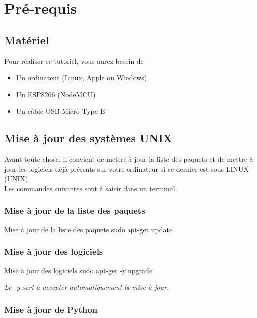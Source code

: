 \chapter{Pré-requis}

\section{Matériel}

Pour réaliser ce tutoriel, vous aurez besoin de 

\begin{itemize}
    \item Un ordinateur (Linux, Apple ou Windows)
    \item Un ESP8266 (NodeMCU)
    \item Un câble USB Micro Type-B
    
\end{itemize}

\section{Mise à jour des systèmes UNIX}

Avant toute chose, il convient de mettre à jour la liste des paquets et de mettre à jour les logiciels déjà présents sur votre ordinateur si ce dernier est sous LINUX (UNIX). \\
Les commandes suivantes sont à saisir dans un terminal.

\subsection{Mise à jour de la liste des paquets}

\begin{Bash}{Mise à jour de la liste des paquets}
sudo apt-get update
\end{Bash}


\subsection{Mise à jour des logiciels}
\begin{Bash}{Mise à jour des logiciels}
sudo apt-get -y upgrade
\end{Bash}

\textit{Le -y sert à accepter automatiquement la mise à jour.}

\subsection{Mise à jour de Python}

